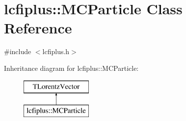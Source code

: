 \section{lcfiplus\-:\-:M\-C\-Particle Class Reference}
\label{classlcfiplus_1_1MCParticle}


{\ttfamily \#include $<$lcfiplus.\-h$>$}

Inheritance diagram for lcfiplus\-:\-:M\-C\-Particle\-:\begin{figure}[H]
\begin{center}
\leavevmode
\includegraphics[height=2.000000cm]{classlcfiplus_1_1MCParticle}
\end{center}
\end{figure}
